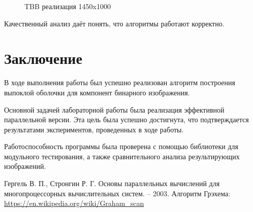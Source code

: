 \documentclass{report}
\begin{document}
\begin{figure}[H]
\caption{TBB реализация 1450x1000}
\end{figure}

\par
Качественный анализ даёт понять, что алгоритмы работают корректно.

\newpage

\section*{Заключение}
В ходе выполнения работы был успешно реализован алгоритм построения выпоклой оболочки для компонент бинарного изображения.
\par 
Основной задачей лабораторной работы была реализация эффективной параллельной версии. Эта цель была успешно достигнута, что подтверждается результатами экспериментов, проведенных в ходе работы. 
\par 
Работоспособность программы была проверена с помощью библиотеки для модульного тестирования, а также сравнительного анализа результирующих изображений.
\newpage

\begin{thebibliography}{1}
Гергель В. П., Стронгин Р. Г. Основы параллельных вычислений для многопроцессорных вычислительных систем. – 2003.
Алгоритм Грэхема: \url {https://en.wikipedia.org/wiki/Graham_scan }
\end{thebibliography}
\newpage
\end{document}
